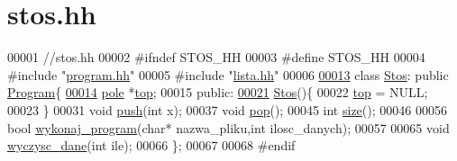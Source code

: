 \hypertarget{stos_8hh}{\section{stos.\-hh}
\label{stos_8hh}
}

\begin{DoxyCode}
00001 \textcolor{comment}{//stos.hh}
00002 \textcolor{preprocessor}{#ifndef STOS\_HH}
00003 \textcolor{preprocessor}{}\textcolor{preprocessor}{#define STOS\_HH}
00004 \textcolor{preprocessor}{}\textcolor{preprocessor}{#include "\hyperlink{program_8hh}{program.hh}"}
00005 \textcolor{preprocessor}{#include "\hyperlink{lista_8hh}{lista.hh}"}
00006 
\hypertarget{stos_8hh_source_l00013}{}\hyperlink{class_stos}{00013} \textcolor{keyword}{class }\hyperlink{class_stos}{Stos}: \textcolor{keyword}{public} \hyperlink{class_program}{Program}\{
\hypertarget{stos_8hh_source_l00014}{}\hyperlink{class_stos_adcfbb6ee470a16fa67eddb412dc556a0}{00014}   \hyperlink{structpole}{pole} *\hyperlink{class_stos_adcfbb6ee470a16fa67eddb412dc556a0}{top};
00015 \textcolor{keyword}{public}:
\hypertarget{stos_8hh_source_l00021}{}\hyperlink{class_stos_a1de3b50386d5dfb56ddece17d0ea2389}{00021}   \hyperlink{class_stos_a1de3b50386d5dfb56ddece17d0ea2389}{Stos}()\{
00022     \hyperlink{class_stos_adcfbb6ee470a16fa67eddb412dc556a0}{top} = NULL;
00023   \}
00031   \textcolor{keywordtype}{void} \hyperlink{class_stos_a08bb7c9208d9a81d30fe569deceb946f}{push}(\textcolor{keywordtype}{int} x);
00037   \textcolor{keywordtype}{void} \hyperlink{class_stos_a88b0da41b49ef4d4b63cfd4924665683}{pop}();
00045   \textcolor{keywordtype}{int} \hyperlink{class_stos_a696195d5125d9bbe6b491bc5985f9461}{size}();
00046 
00056   \textcolor{keywordtype}{bool} \hyperlink{class_program_ac396401ba5cade863d0e6acb727bec4e}{wykonaj\_program}(\textcolor{keywordtype}{char}* nazwa\_pliku,\textcolor{keywordtype}{int} ilosc\_danych);
00057 
00065   \textcolor{keywordtype}{void} \hyperlink{class_stos_aa54f9d021e324f5a204dbc8193dd9a6e}{wyczysc\_dane}(\textcolor{keywordtype}{int} ile);
00066 \};
00067 
00068 \textcolor{preprocessor}{#endif}
\end{DoxyCode}
